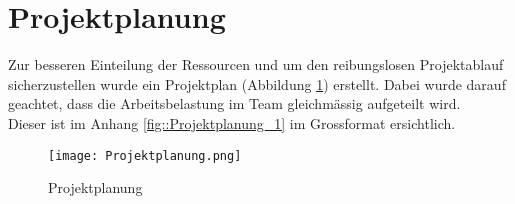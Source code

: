 \section{Projektplanung}

Zur besseren Einteilung der Ressourcen und um den reibungslosen Projektablauf sicherzustellen wurde ein Projektplan (Abbildung \ref{fig::Projektplanung}) erstellt. 
Dabei wurde darauf geachtet, dass die Arbeitsbelastung im Team gleichmässig aufgeteilt wird.\\
Dieser ist im Anhang \ref{fig::Projektplanung_1} im Grossformat ersichtlich.


\begin{figure}[h] 
\centering
\texttt{[image: Projektplanung.png]}%
\caption{Projektplanung}%
\label{fig::Projektplanung}%
\end{figure}